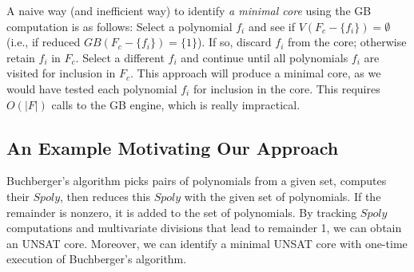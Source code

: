 A naive way (and inefficient way) to identify {\it a minimal core}
using the GB computation is as follows:
Select a polynomial $f_i$ and see if $V(F_c - \{f_i\}) = \emptyset$
(i.e., if reduced $GB(F_c - \{f_i\}) = \{1\}$). If so, discard $f_i$
from the core; otherwise retain $f_i$ in $F_c$. Select a different
$f_i$ and continue until all polynomials $f_i$ are visited for
inclusion in $F_c$. This approach will produce a minimal core, as we
would have tested each polynomial $f_i$ for inclusion in the
core. This requires $O(|F|)$ calls to the GB engine, which is really
impractical.   

\subsection{An Example Motivating Our Approach}

Buchberger's algorithm picks pairs of polynomials from a given set, computes their $Spoly$, then reduces this $Spoly$
with the given set of polynomials. If the remainder is nonzero,
it is added to the set of polynomials.
By tracking $Spoly$ computations and multivariate divisions that lead to remainder 
1, we can obtain an UNSAT core. Moreover, we can identify a minimal UNSAT core with one-time
 execution of Buchberger's algorithm.

